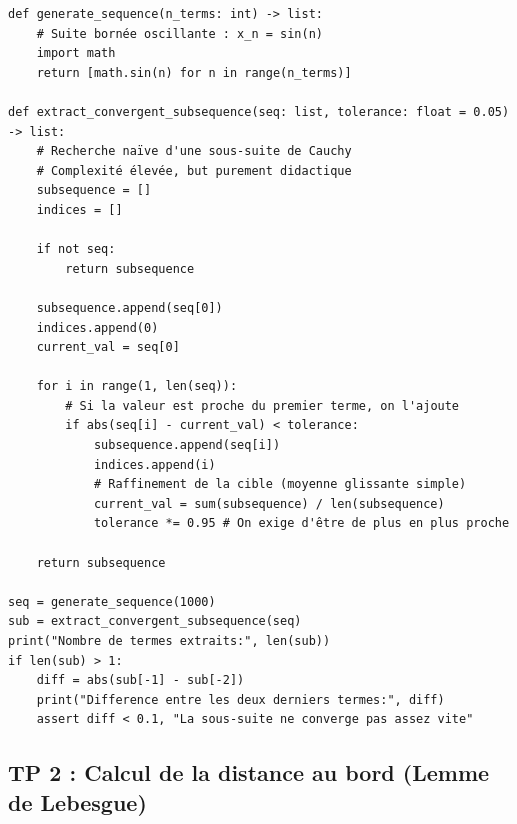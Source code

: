 \documentclass[11pt,a4paper]{article}
\begin{document}
\begin{lstlisting}
def generate_sequence(n_terms: int) -> list:
    # Suite bornée oscillante : x_n = sin(n)
    import math
    return [math.sin(n) for n in range(n_terms)]

def extract_convergent_subsequence(seq: list, tolerance: float = 0.05) -> list:
    # Recherche naïve d'une sous-suite de Cauchy
    # Complexité élevée, but purement didactique
    subsequence = []
    indices = []

    if not seq:
        return subsequence

    subsequence.append(seq[0])
    indices.append(0)
    current_val = seq[0]

    for i in range(1, len(seq)):
        # Si la valeur est proche du premier terme, on l'ajoute
        if abs(seq[i] - current_val) < tolerance:
            subsequence.append(seq[i])
            indices.append(i)
            # Raffinement de la cible (moyenne glissante simple)
            current_val = sum(subsequence) / len(subsequence)
            tolerance *= 0.95 # On exige d'être de plus en plus proche

    return subsequence

seq = generate_sequence(1000)
sub = extract_convergent_subsequence(seq)
print("Nombre de termes extraits:", len(sub))
if len(sub) > 1:
    diff = abs(sub[-1] - sub[-2])
    print("Difference entre les deux derniers termes:", diff)
    assert diff < 0.1, "La sous-suite ne converge pas assez vite"
\end{lstlisting}

\subsection*{TP 2 : Calcul de la distance au bord (Lemme de Lebesgue)}
\end{document}
